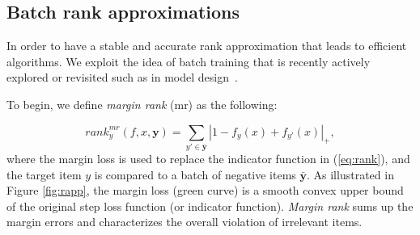 \documentclass[letterpaper]{article} %
\begin{document}
\subsection{Batch rank approximations}

In order to have a stable and accurate rank approximation that leads to efficient algorithms. We exploit the idea of batch training that is recently actively explored or revisited such as in model design~\cite{covington2016deep}.%

To begin, we define \textit{margin rank} (mr) as the following:

\begin{equation}
\label{eq:mr}
rank^{mr}_y(f,x,\textbf{y}) =\sum_{y'\in \bar{\textbf{y}} } |1-f_y(x) + f_{y'}(x)|_+, %
\end{equation}
where the margin loss is used to replace the indicator function in (\ref{eq:rank}), and the target item $y$ is compared to a batch of negative items $\bar{\textbf{y}}$.
As illustrated in Figure \ref{fig:rapp}, the margin loss (green curve) is a smooth convex upper bound of the original step loss function (or indicator function). \textit{Margin rank} sums up the margin errors and characterizes the overall violation of irrelevant items.
\end{document}
